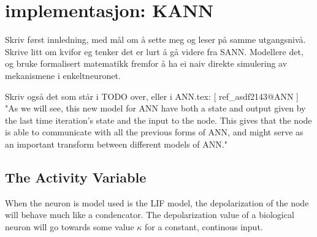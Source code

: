 %



\section{implementasjon: KANN}
	

	Skriv først innledning, med mål om å sette meg og leser på samme utgangsnivå.
	Skrive litt om kvifor eg tenker det er lurt å gå videre fra SANN.
	Modellere det, og bruke formalisert matematikk fremfor å ha ei naiv direkte simulering av mekanismene i enkeltneuronet.

	Skriv også det som står i TODO over, eller i ANN.tex: [ ref\_asdf2143@ANN ]%
	"As we will see, this new model for ANN have both a state and output given by the last time iteration's state and the input to the node. 
	This gives that the node is able to communicate with all the previous forms of ANN, and might serve as an important transform between different models of ANN."

 		\subsection{The Activity Variable} %
	When the neuron is model used is the LIF model, the depolarization of the node will behave much like a condencator. 
	The depolarization value of a biological neuron will go towards some value $\kappa$ for a constant, continous input.

